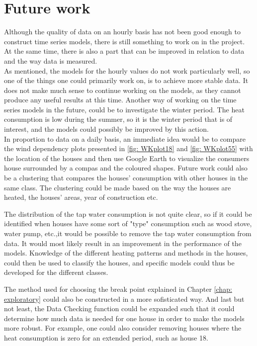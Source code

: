 \section{Future work}
Although the quality of data on an hourly basis has not been good enough to construct time series models, there is still something to work on in the project. At the same time, there is also a part that can be improved in relation to data and the way data is measured. \\

\noindent As mentioned, the models for the hourly values do not ​​work particularly well, so one of the things one could primarily work on, is to achieve more stable data. It does not make much sense to continue working on the models, as they cannot produce any useful results at this time. Another way of working on the time series models in the future, could be to investigate the winter period. The heat consumption is low during the summer, so it is the winter period that is of interest, and the models could possibly be improved by this action. \\

\noindent In proportion to data on a daily basis, an immediate idea would be to compare the wind dependency plots presented in \cref{fig: WKplot18} and \cref{fig: WKplot55} with the location of the houses and then use Google Earth to visualize the consumers house surrounded by a compas and the coloured shapes. Future work could also be a clustering that compares the houses' consumption with other houses in the same class. The clustering could be made based on the way the houses are heated, the houses' areas, year of construction etc.

\noindent The distribution of the tap water consumption is not quite clear, so if it could be identified when houses have some sort of "type" consumption such as wood stove, water pump, etc.,it would be possible to remove the tap water consumption from data. It would most likely result in an improvement in the performance of the models. Knowledge of the different heating patterns and methods in the houses, could then be used to classify the houses, and specific models could thus be developed for the different classes.

\noindent The method used for choosing the break point explained in Chapter \ref{chap: exploratory} could also be constructed in a more sofisticated way. And last but not least, the Data Checking function could be expanded such that it could determine how much data is needed for one house in order to make the models more robust. For example, one could also consider removing houses where the heat consumption is zero for an extended period, such as house 18.
